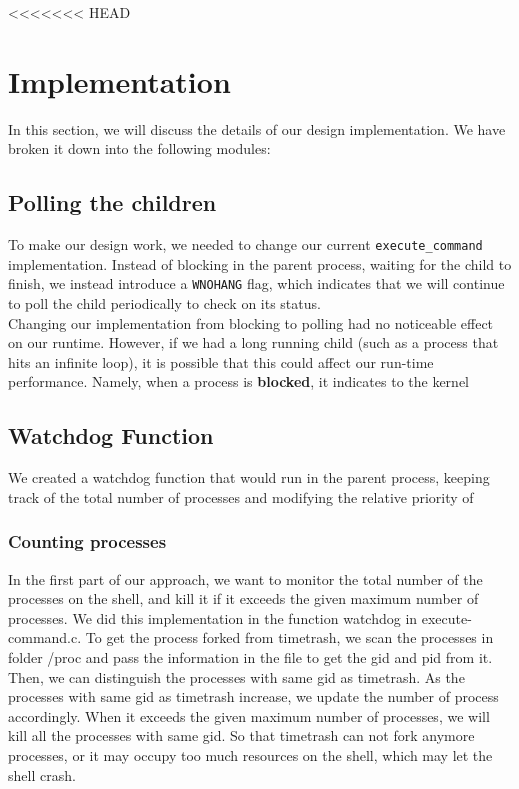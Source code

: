 \documentclass{article}
\begin{document}


<<<<<<< HEAD
\section{Implementation}
In this section, we will discuss the details of our design implementation. We
have broken it down into the following modules:
\subsection{Polling the children}
To make our design work, we needed to change our current \verb+execute_command+
implementation. Instead of blocking in the parent process, waiting for the
child to finish, we instead introduce a \verb+WNOHANG+ flag, which indicates
that we will continue to poll the child periodically to check on its status. \\
Changing our implementation from blocking to polling had no noticeable effect
on our runtime. However, if we had a long running child (such as a process that
hits an infinite loop), it is possible that this could affect our run-time 
performance. Namely, when a process is \textbf{blocked}, it indicates to the 
kernel 
\subsection{Watchdog Function}
We created a watchdog function that would run in the parent process, keeping
track of the total number of processes and modifying the relative priority of

\subsubsection{Counting processes}


In the first part of our approach, we want to monitor the total number of the processes on the shell, and kill it if it exceeds the given maximum number of processes.
We did this implementation in the function watchdog in execute-command.c.  To get the process forked from timetrash, we scan the processes in folder /proc and pass the information in the file to get the gid and pid from it.  Then, we can distinguish the processes with same gid as timetrash.  As the processes with same gid as timetrash increase, we update the number of process accordingly.  When it exceeds the given maximum number of processes, we will kill all the processes with same gid.  So that timetrash can not fork anymore processes, or it may occupy too much resources on the shell, which may let the shell crash. \\
\end{document}
